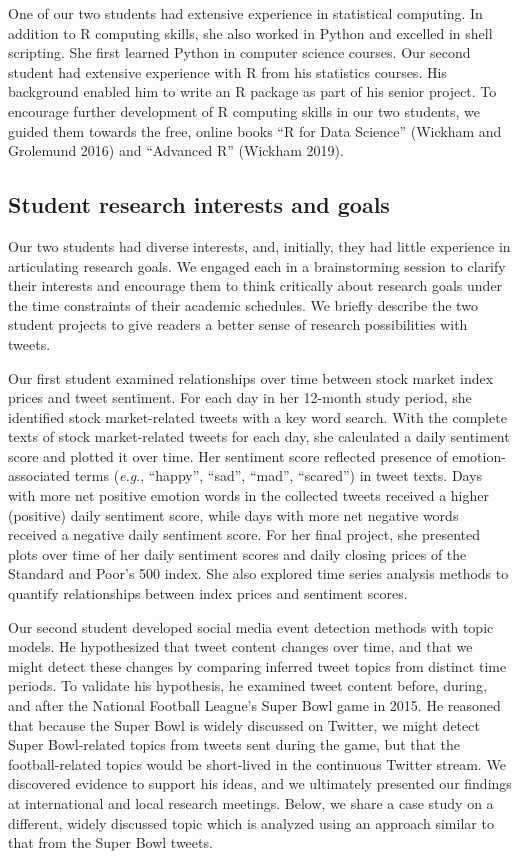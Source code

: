 \documentclass[
]{article}
\begin{document}
One of our two students had extensive experience in statistical computing. In
addition to R computing skills, she also worked in Python and excelled in shell scripting.
She first learned Python in computer science courses. Our second student had
extensive experience with R from his statistics courses. His background
enabled him to write an R package as part of his senior project. To encourage
further development of R computing skills in our two students, we guided them
towards the free, online books ``R for Data Science'' (Wickham and Grolemund 2016) and ``Advanced R'' (Wickham 2019).

\hypertarget{student-research-interests-and-goals}{%
\subsection{Student research interests and goals}\label{student-research-interests-and-goals}}

Our two students had diverse interests, and, initially, they had little experience in
articulating research goals. We engaged each in a brainstorming session to
clarify their interests and encourage them to think critically about research goals under
the time constraints of their academic schedules.
We briefly describe the two student projects to give readers a better sense
of research possibilities with tweets.

Our first student examined relationships over time between
stock market index prices and tweet sentiment. For each day in her 12-month study period,
she identified stock market-related tweets with a key word search. With the complete
texts of stock market-related tweets for each day, she calculated a daily sentiment score and plotted it over time.
Her sentiment score reflected presence of emotion-associated terms
(\emph{e.g}., ``happy'', ``sad'', ``mad'', ``scared'')
in tweet texts. Days with more net positive emotion words in the collected tweets received a higher
(positive) daily sentiment score, while days with more net negative words received a negative daily
sentiment score.
For her final project, she presented plots over time of her daily sentiment scores and daily closing
prices of the Standard and Poor's 500 index. She also explored time series analysis methods to quantify
relationships between index prices and sentiment scores.

Our second student developed social media event detection methods with topic
models. He hypothesized that tweet content changes over time, and that we
might detect these changes by comparing inferred tweet topics from distinct
time periods. To validate his hypothesis, he examined tweet content before, during, and after
the National Football League's Super Bowl game in 2015. He reasoned that
because the Super Bowl is widely discussed on Twitter, we might detect
Super Bowl-related topics from tweets sent during the game, but that the football-related
topics would be short-lived in the continuous Twitter stream. We discovered
evidence to support his ideas, and we ultimately presented our findings
at international and local research meetings. Below, we share a case study on a different, widely discussed topic which is analyzed using an approach similar to that from the Super Bowl tweets.
\end{document}
